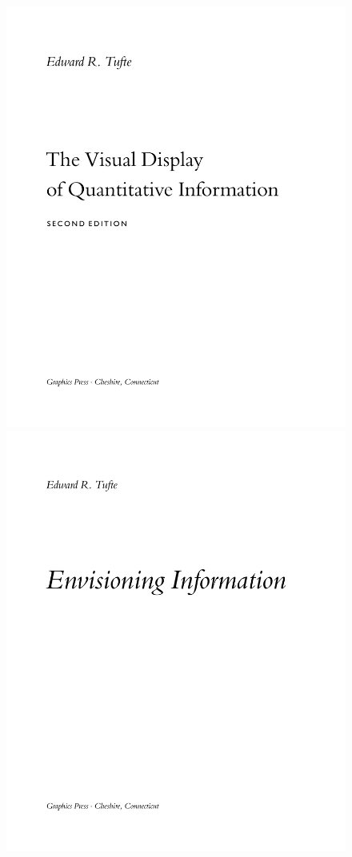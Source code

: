 \documentclass[
  twoside,
  symmetric]{tufte-book}
\begin{document}
\begin{figure}

\includegraphics[width=0.45\linewidth,height=\textheight,keepaspectratio]{style-guide/graphics/vdqi-title.pdf}
\includegraphics[width=0.45\linewidth,height=\textheight,keepaspectratio]{style-guide/graphics/ei-title.pdf}


\end{figure}
\end{document}
